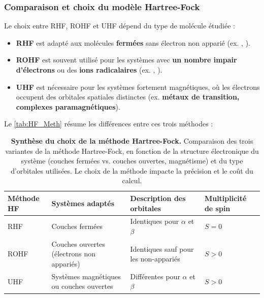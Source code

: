 \documentclass[12pt,a4paper]{article} %
\numberwithin{equation}{section} %
\numberwithin{figure}{section} %
\numberwithin{table}{section} %
\begin{document}
\subsubsection{Comparaison et choix du modèle Hartree-Fock}

Le choix entre RHF, ROHF et UHF dépend du type de molécule étudiée :
\begin{itemize}
    \item \textbf{RHF} est adapté aux molécules \textbf{fermées} sans électron non apparié (ex. , ).

    \item \textbf{ROHF} est souvent utilisé pour les systèmes avec \textbf{un nombre impair d’électrons} ou des \textbf{ions radicalaires} (ex. , ).

    \item \textbf{UHF} est nécessaire pour les systèmes fortement magnétiques, où les électrons occupent des orbitales spatiales distinctes (ex. \textbf{métaux de transition, complexes paramagnétiques}).
\end{itemize}

Le \autoref{tab:HF_Meth} résume les différences entre ces trois méthodes :

\begin{table}[h!]
    \centering
    \begin{tabular}{|p{}|p{5cm}|p{5cm}|p{}|}
        \hline
        \textbf{Méthode HF} & \textbf{Systèmes adaptés} & \textbf{Description des orbitales} & \textbf{Multiplicité de spin} \\
        \hline
        RHF  & Couches fermées & Identiques pour $\alpha$ et $\beta$ & $S=0$ \\
        \hline
        ROHF & Couches ouvertes (électrons non appariés) & Identiques sauf pour les non-appariés & $S>0$ \\
        \hline
        UHF  & Systèmes magnétiques ou couches ouvertes & Différentes pour $\alpha$ et $\beta$ & $S>0$ \\
        \hline
    \end{tabular}
    \caption{\textbf{Synthèse du choix de la méthode Hartree-Fock.} Comparaison des trois variantes de la méthode Hartree-Fock, en fonction de la structure électronique du système (couches fermées vs. couches ouvertes, magnétisme) et du type d'orbitales utilisées. Le choix de la méthode impacte la précision et le coût du calcul.} \label{tab:HF_Meth}
\end{table}
\end{document}
